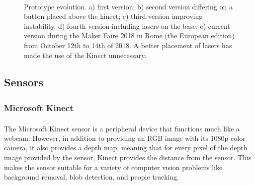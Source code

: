 \begin{figure}[H]
\begin{subfigure}[b]{0.3\textwidth}
      	\centering
      	\label{newrobot}
      	\caption{}
      \end{subfigure}
      ~
      \begin{subfigure}[b]{0.3\textwidth}
	      \centering
	      \label{newrobot}
	      \caption{}
      \end{subfigure}
      \caption{Prototype evolution. a) first version; b) second version differing on a button placed above the kinect; c) third version improving instability. d) fourth version including lasers on the base; e) current version during the Maker Faire 2018 in Rome (the European edition) from October 12th to 14th of 2018. A better placement of lasers has made the use of the Kinect unnecessary.}
      \label{fig:evolution}
\end{figure}

\subsection{Sensors}
\subsubsection{Microsoft Kinect\textsuperscript{\textregistered}\label{sec:kinectsec}}
The Microsoft Kinect\textsuperscript{\textregistered} sensor is a peripheral device that functions much like a webcam. However, in addition to providing an RGB image with its 1080p color camera, it also provides a depth map,  meaning that for every pixel of the depth image provided by the sensor, Kinect provides the distance from the sensor. This makes the sensor suitable for a variety of computer vision problems like background removal, blob detection, and people tracking.


